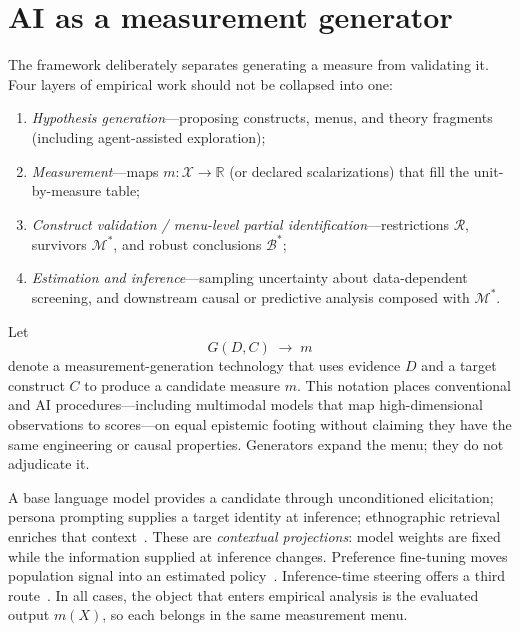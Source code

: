 \documentclass[10pt,letterpaper]{article}
\newcommand{\M}{\ensuremath{\mathcal{M}}}
\newcommand{\Rset}{\mathcal{R}}
\newcommand{\Bset}{\mathcal{B}}
\begin{document}
\section{AI as a measurement generator}
\label{sec:ai}
The framework deliberately separates generating a measure from validating it.
Four layers of empirical work should not be collapsed into one:
\begin{enumerate}[label=(\roman*)]
\item \emph{Hypothesis generation}---proposing constructs, menus, and theory fragments (including agent-assisted exploration);
\item \emph{Measurement}---maps $m:\mathcal{X}\to\mathbb{R}$ (or declared scalarizations) that fill the unit-by-measure table;
\item \emph{Construct validation / menu-level partial identification}---restrictions $\Rset$, survivors $\M^*$, and robust conclusions $\Bset^*$;
\item \emph{Estimation and inference}---sampling uncertainty about data-dependent screening, and downstream causal or predictive analysis composed with $\M^*$.
\end{enumerate}
Let
\begin{equation}
G(D,C)\;\longrightarrow\; m
\label{eq:generator}
\end{equation}
denote a measurement-generation technology that uses evidence $D$ and a target construct $C$ to produce a candidate measure $m$.
This notation places conventional and AI procedures---including multimodal models that map high-dimensional observations to scores---on equal epistemic footing without claiming they have the same engineering or causal properties.
Generators expand the menu; they do not adjudicate it.

A base language model provides a candidate through unconditioned elicitation; persona prompting supplies a target identity at inference; ethnographic retrieval enriches that context~\cite{capra2025}.
These are \emph{contextual projections}: model weights are fixed while the information supplied at inference changes.
Preference fine-tuning moves population signal into an estimated policy~\cite{rafailov2023,plural2026,palms2026}.
Inference-time steering offers a third route~\cite{disca2026}.
In all cases, the object that enters empirical analysis is the evaluated output $m(X)$, so each belongs in the same measurement menu.
\end{document}
